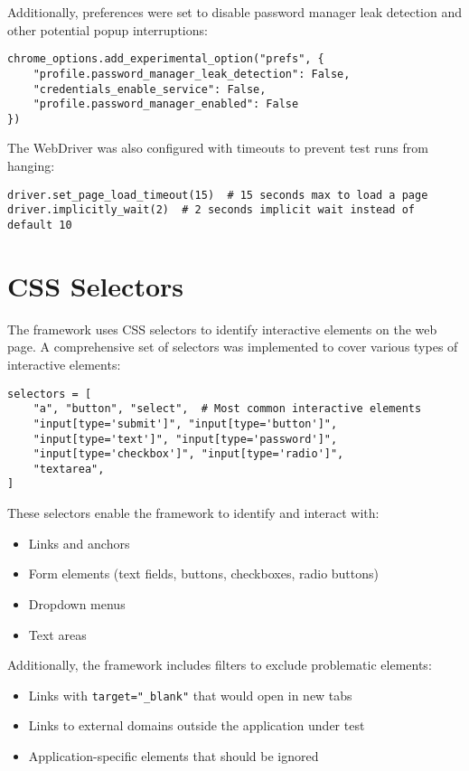 Additionally, preferences were set to disable password manager leak detection and other potential popup interruptions:

\begin{lstlisting}[caption=Chrome WebDriver Preferences]
chrome_options.add_experimental_option("prefs", {
    "profile.password_manager_leak_detection": False,
    "credentials_enable_service": False,
    "profile.password_manager_enabled": False
})
\end{lstlisting}

The WebDriver was also configured with timeouts to prevent test runs from hanging:

\begin{lstlisting}[caption=WebDriver Timeouts]
driver.set_page_load_timeout(15)  # 15 seconds max to load a page
driver.implicitly_wait(2)  # 2 seconds implicit wait instead of default 10
\end{lstlisting}

\section{CSS Selectors}

The framework uses CSS selectors to identify interactive elements on the web page. A comprehensive set of selectors was implemented to cover various types of interactive elements:

\begin{lstlisting}[caption=CSS Selectors for Interactive Elements]
selectors = [
    "a", "button", "select",  # Most common interactive elements
    "input[type='submit']", "input[type='button']",
    "input[type='text']", "input[type='password']", 
    "input[type='checkbox']", "input[type='radio']",
    "textarea",
]
\end{lstlisting}

These selectors enable the framework to identify and interact with:
\begin{itemize}
    \item Links and anchors
    \item Form elements (text fields, buttons, checkboxes, radio buttons)
    \item Dropdown menus
    \item Text areas
\end{itemize}

Additionally, the framework includes filters to exclude problematic elements:
\begin{itemize}
    \item Links with \texttt{target="\_blank"} that would open in new tabs
    \item Links to external domains outside the application under test
    \item Application-specific elements that should be ignored
\end{itemize}

